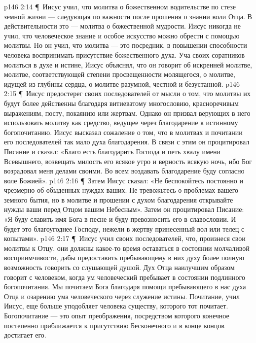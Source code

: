 \vs p146 2:14 \P\ \bibnobreakspace Иисус учил, что молитва о божественном водительстве по стезе земной жизни --- следующая по важности после прошения о знании воли Отца. В действительности это --- молитва о божественной мудрости. Иисус никогда не учил, что человеческое знание и особое искусство можно обрести с помощью молитвы. Но он учил, что молитва --- это посредник, в повышении способности человека воспринимать присутствие божественного духа. Уча своих соратников молиться в духе и истине, Иисус объяснял, что он говорит об искренней молитве, молитве, соответствующей степени просвещенности молящегося, о молитве, идущей из глубины сердца, о молитве разумной, честной и безустанной.
\vs p146 2:15 \P\ \bibnobreakspace Иисус предостерег своих последователей от мысли о том, что молитвы их будут более действенны благодаря витиеватому многословию, красноречивым выражениям, посту, покаянию или жертвам. Однако он призвал верующих в него использовать молитву как средство, ведущее через благодарение к истинному богопочитанию. Иисус высказал сожаление о том, что в молитвах и почитании его последователей так мало духа благодарения. В связи с этим он процитировал Писание и сказал: «Благо есть благодарить Господа и петь хвалу имени Всевышнего, возвещать милость его всякое утро и верность всякую ночь, ибо Бог возрадовал меня делами своими. Во всем воздавать благодарение буду согласно воле Божией».
\vs p146 2:16 \P\ \bibnobreakspace Затем Иисус сказал: «Не беспокойтесь постоянно и чрезмерно об обыденных нуждах ваших. Не тревожьтесь о проблемах вашего земного бытия, но в молитве и прошении с духом благодарения открывайте нужды ваши перед Отцом вашим Небесным». Затем он процитировал Писание: «Я буду славить имя Бога в песне и буду превозносить его в славословии. И будет это благоугоднее Господу, нежели в жертву принесенный вол или телец с копытами».
\vs p146 2:17 \P\ \bibnobreakspace Иисус учил своих последователей, что, произнеся свои молитвы к Отцу, они должны какое\hyp{}то время оставаться в состоянии молчаливой восприимчивости, дабы предоставить пребывающему в них духу более полную возможность говорить со слушающей душой. Дух Отца наилучшим образом говорит с человеком, когда ум человеческий пребывает в состоянии подлинного богопочитания. Мы почитаем Бога благодаря помощи пребывающего в нас духа Отца и озарению ума человеческого через служение истины. Почитание, учил Иисус, еще больше уподобляет человека существу, которого тот почитает. Богопочитание --- это опыт преображения, посредством которого конечное постепенно приближается к присутствию Бесконечного и в конце концов достигает его.
